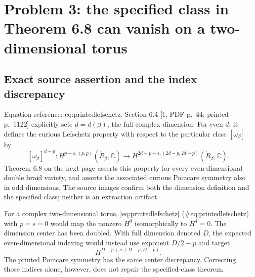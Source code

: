 \documentclass[10pt]{article}
\begin{document}
\section*{Problem 3: the specified class in Theorem 6.8 can vanish on a two-dimensional torus}
\subsection*{Exact source assertion and the index discrepancy}
Equation reference: eq:printedlefschetz. Section 6.4 [1, PDF p. 44; printed p. 1122] explicitly sets \(d=d(\beta)\), the full complex dimension. For even \(d\), it defines the curious Lefschetz property with respect to the particular class \([\omega_\beta]\) by \[
 [\omega_\beta]^{d-p}:
 H^{p+s,(p,p)}(\mathring R_\beta,\mathbb C)
 \longrightarrow H^{2d-p+s,(2d-p,2d-p)}(\mathring R_\beta,\mathbb C).\] Theorem 6.8 on the next page asserts this property for every even-dimensional double braid variety, and asserts the associated curious Poincare symmetry also in odd dimensions. The source images confirm both the dimension definition and the specified class; neither is an extraction artifact.\par
For a complex two-dimensional torus, [eq:printedlefschetz] (\#eq:printedlefschetz) with \(p=s=0\) would map the nonzero \(H^0\) isomorphically to \(H^4=0\). The dimension center has been doubled. With full dimension denoted \(D\), the expected even-dimensional indexing would instead use exponent \(D/2-p\) and target \[H^{D-p+s,(D-p,D-p)}.\] The printed Poincare symmetry has the same center discrepancy. Correcting those indices alone, however, does not repair the specified-class theorem.\par
\end{document}
